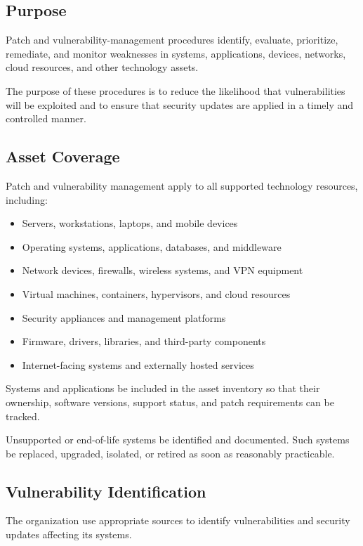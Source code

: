 \subsection{Purpose}

Patch and vulnerability-management procedures identify, evaluate, prioritize, remediate, and monitor weaknesses in systems, applications, devices, networks, cloud resources, and other technology assets.

The purpose of these procedures is to reduce the likelihood that vulnerabilities will be exploited and to ensure that security updates are applied in a timely and controlled manner.

\subsection{Asset Coverage}

Patch and vulnerability management \must{} apply to all supported technology resources, including:
\begin{itemize}
    \item Servers, workstations, laptops, and mobile devices
    \item Operating systems, applications, databases, and middleware
    \item Network devices, firewalls, wireless systems, and VPN equipment
    \item Virtual machines, containers, hypervisors, and cloud resources
    \item Security appliances and management platforms
    \item Firmware, drivers, libraries, and third-party components
    \item Internet-facing systems and externally hosted services
\end{itemize}

Systems and applications \must{} be included in the asset inventory so that their ownership, software versions, support status, and patch requirements can be tracked.

Unsupported or end-of-life systems \must{} be identified and documented. Such systems \must{} be replaced, upgraded, isolated, or retired as soon as reasonably practicable.

\subsection{Vulnerability Identification}

The organization \must{} use appropriate sources to identify vulnerabilities and security updates affecting its systems.

